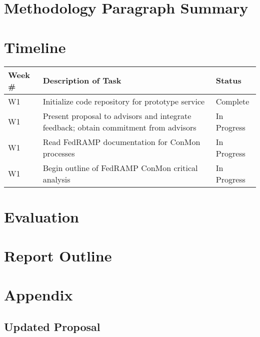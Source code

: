 \documentclass{jdf}
\begin{document}
\section*{Methodology Paragraph Summary}

\section*{Timeline}

\begin{table}[h]
\begin{tabularx}{\textwidth}{|l|X|l|}
    \hline
    Week \# & Description of Task & Status \\ [0.5ex] 
    \hline
    W1 & Initialize code repository for prototype service & Complete \\
    \hline
    W1 & Present proposal to advisors and integrate feedback; obtain commitment from advisors & In Progress \\
    \hline
    W1 & Read FedRAMP documentation for ConMon processes & In Progress \\
    \hline
    W1 & Begin outline of FedRAMP ConMon critical analysis & In Progress \\
    \hline
\end{tabularx}
\end{table}

\section*{Evaluation}

\section*{Report Outline}

\nocite{*}



\section*{Appendix}

\subsection*{Updated Proposal}


\end{document}
